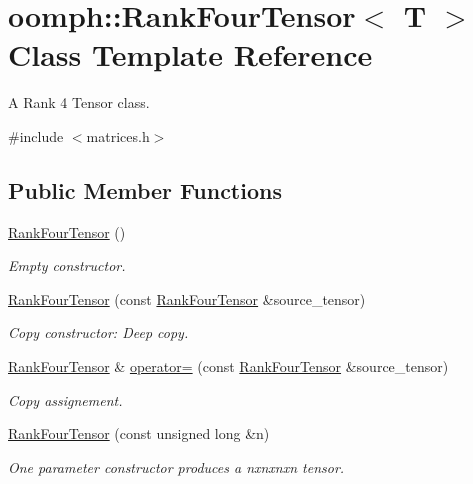 \hypertarget{classoomph_1_1RankFourTensor}{}\section{oomph\+:\+:Rank\+Four\+Tensor$<$ T $>$ Class Template Reference}
\label{classoomph_1_1RankFourTensor}


A Rank 4 Tensor class.  




{\ttfamily \#include $<$matrices.\+h$>$}

\subsection*{Public Member Functions}
\begin{DoxyCompactItemize}
\item 
\hyperlink{classoomph_1_1RankFourTensor_a1fc311bc9c6ae0d7e2845b743b963e80}{Rank\+Four\+Tensor} ()
\begin{DoxyCompactList}\small\item\em Empty constructor. \end{DoxyCompactList}\item 
\hyperlink{classoomph_1_1RankFourTensor_ae1d00ed47ac1c4ce7dd1b8360affeecc}{Rank\+Four\+Tensor} (const \hyperlink{classoomph_1_1RankFourTensor}{Rank\+Four\+Tensor} \&source\+\_\+tensor)
\begin{DoxyCompactList}\small\item\em Copy constructor\+: Deep copy. \end{DoxyCompactList}\item 
\hyperlink{classoomph_1_1RankFourTensor}{Rank\+Four\+Tensor} \& \hyperlink{classoomph_1_1RankFourTensor_ada0e9ac228c3515b8d785fdf7bd950a3}{operator=} (const \hyperlink{classoomph_1_1RankFourTensor}{Rank\+Four\+Tensor} \&source\+\_\+tensor)
\begin{DoxyCompactList}\small\item\em Copy assignement. \end{DoxyCompactList}\item 
\hyperlink{classoomph_1_1RankFourTensor_abc9c7f196e6a8521ee01a8a656700cc4}{Rank\+Four\+Tensor} (const unsigned long \&n)
\begin{DoxyCompactList}\small\item\em One parameter constructor produces a nxnxnxn tensor. \end{DoxyCompactList}\item 

\end{DoxyCompactItemize}
